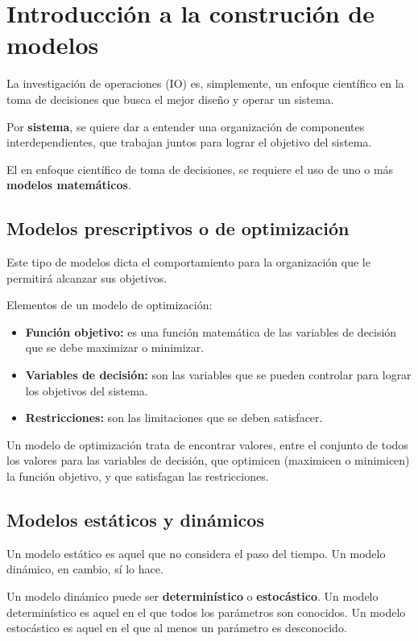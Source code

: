\documentclass[../main.tex]{subfiles}
\begin{document}
    \section{Introducción a la construción de modelos} 
        La investigación de operaciones (IO) es, simplemente, un enfoque científico en la toma de decisiones que busca el mejor diseño y operar un sistema.

        Por \textbf{sistema}, se quiere dar a entender una organización de componentes interdependientes, que trabajan juntos para lograr el objetivo del sistema.

        El en enfoque científico de toma de decisiones, se requiere el uso de uno o más \textbf{modelos matemáticos}.

        \subsection{Modelos prescriptivos o de optimización}
            Este tipo de modelos dicta el comportamiento para la organización que le permitirá alcanzar sus objetivos. 

            Elementos de un modelo de optimización:
            \begin{itemize}
                \item \textbf{Función objetivo:} es una función matemática de las variables de decisión que se debe maximizar o minimizar.
                \item \textbf{Variables de decisión:} son las variables que se pueden controlar para lograr los objetivos del sistema.
                \item \textbf{Restricciones:} son las limitaciones que se deben satisfacer.
            \end{itemize}

            Un modelo de optimización trata de encontrar valores, entre el conjunto de todos los valores para las variables de decisión, que optimicen (maximicen o minimicen) la función objetivo, y que satisfagan las restricciones.

        \subsection{Modelos estáticos y dinámicos}
            Un modelo estático es aquel que no considera el paso del tiempo. Un modelo dinámico, en cambio, sí lo hace.

            Un modelo dinámico puede ser \textbf{determinístico} o \textbf{estocástico}. Un modelo determinístico es aquel en el que todos los parámetros son conocidos. Un modelo estocástico es aquel en el que al menos un parámetro es desconocido.
\end{document}

